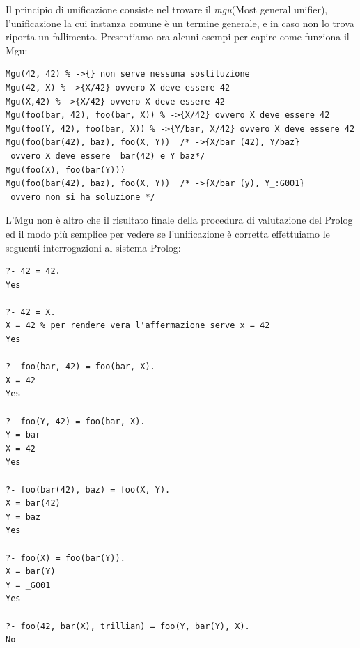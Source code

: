 \documentclass[a4paper]{book}
\begin{document}
Il principio di unificazione consiste nel trovare il \emph{mgu}(Most general unifier),
l'unificazione la cui instanza comune è un termine generale, e in caso non lo trova riporta un fallimento.\newline
Presentiamo ora alcuni esempi per capire come funziona il Mgu:
\begin{verbatim}
Mgu(42, 42) % ->{} non serve nessuna sostituzione
Mgu(42, X) % ->{X/42} ovvero X deve essere 42
Mgu(X,42) % ->{X/42} ovvero X deve essere 42
Mgu(foo(bar, 42), foo(bar, X)) % ->{X/42} ovvero X deve essere 42
Mgu(foo(Y, 42), foo(bar, X)) % ->{Y/bar, X/42} ovvero X deve essere 42
Mgu(foo(bar(42), baz), foo(X, Y))  /* ->{X/bar (42), Y/baz}
 ovvero X deve essere  bar(42) e Y baz*/
Mgu(foo(X), foo(bar(Y)))
Mgu(foo(bar(42), baz), foo(X, Y))  /* ->{X/bar (y), Y_:G001}
 ovvero non si ha soluzione */
\end{verbatim}
L'Mgu non è altro che il risultato finale della procedura di valutazione del Prolog ed il modo più semplice per vedere
se l'unificazione è corretta effettuiamo le seguenti interrogazioni al sistema Prolog:
\begin{verbatim}
?- 42 = 42.
Yes

?- 42 = X.
X = 42 % per rendere vera l'affermazione serve x = 42
Yes

?- foo(bar, 42) = foo(bar, X).
X = 42
Yes

?- foo(Y, 42) = foo(bar, X).
Y = bar
X = 42
Yes

?- foo(bar(42), baz) = foo(X, Y).
X = bar(42)
Y = baz
Yes

?- foo(X) = foo(bar(Y)).
X = bar(Y)
Y = _G001
Yes

?- foo(42, bar(X), trillian) = foo(Y, bar(Y), X).
No
\end{verbatim}
\end{document}
